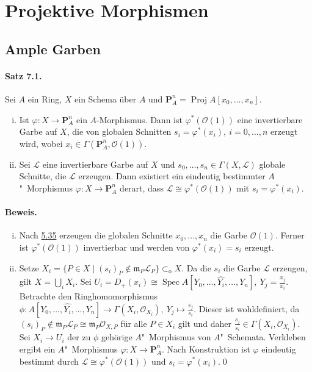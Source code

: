 \section{Projektive Morphismen}

\subsection{Ample Garben}

\paragraph{Satz 7.1.}\label{7.1} Sei $A$ ein Ring, $X$ ein Schema über $A$ und $\mathbf{P}_A^n=\operatorname{Proj}A[x_0,\ldots,x_n]$.
\begin{enumerate}[(i)]
\item Ist $\varphi:X\to\mathbf{P}_A^n$ ein $A$-Morphismus. Dann ist $\varphi^\ast(\mathcal{O}(1))$ eine invertierbare Garbe auf $X$, die von globalen Schnitten $s_i=\varphi^\ast(x_i),\ i=0,\ldots,n$ erzeugt wird, wobei $x_i\in\Gamma(\mathbf{P}_A^n,\mathcal{O}(1))$.
\item Sei $\mathcal{L}$ eine invertierbare Garbe auf $X$ und $s_0,\ldots,s_n\in\Gamma(X,\mathcal{L})$ globale Schnitte, die $\mathcal{L}$ erzeugen. Dann existiert ein eindeutig bestimmter $A$"~Morphismus $\varphi:X\to\mathbf{P}_A^n$ derart, dass $\mathcal{L}\cong\varphi^\ast(\mathcal{O}(1))$ mit $s_i=\varphi^\ast(x_i)$.
\end{enumerate}

\paragraph{Beweis.} \begin{enumerate}[(i)]
\item Nach \hyperref[5.35]{5.35} erzeugen die globalen Schnitte $x_0,\ldots,x_n$ die Garbe $\mathcal{O}(1)$. Ferner ist $\varphi^\ast(\mathcal{O}(1))$ invertierbar und werden von $\varphi^\ast(x_i)=s_i$ erzeugt.
\item Setze $X_i=\{P\in X\mid (s_i)_P\not\in\mathfrak{m}_P\mathcal{L}_P\}\subset_\text{o}X$. Da die $s_i$ die Garbe $\mathcal{L}$ erzeugen, gilt $X=\bigcup_iX_i$. Sei $U_i=D_+(x_i)\cong\operatorname{Spec}A[Y_0,\ldots,\widehat{Y_i},\ldots,Y_n],\ Y_j=\frac{x_j}{x_i}$. Betrachte den Ringhomomorphismus $\phi:A[Y_0,\ldots,\widehat{Y_i},\ldots,Y_n]\to\Gamma(X_i,\mathcal{O}_{X_i}),\ Y_j\mapsto \frac{s_j}{s_i}$. Dieser ist wohldefiniert, da  $(s_i)_P\not\in \mathfrak{m}_P\mathcal{L}_P\cong\mathfrak{m}_P\mathcal{O}_{X,P}$ für alle $P\in X_i$ gilt und daher $\frac{s_j}{s_i}\in\Gamma(X_i,\mathcal{O}_{X_i})$. Sei $X_i\to U_i$ der zu $\phi$ gehörige $A$"~Morphismus von $A$"~Schemata. Verkleben ergibt ein $A$"~Morphismus $\varphi:X\to\mathbf{P}_A^n$. Nach Konstruktion ist $\varphi$ eindeutig bestimmt durch $\mathcal{L}\cong\varphi^\ast(\mathcal{O}(1))$ und $s_i=\varphi^\ast(x_i)$.\qed
\end{enumerate}

